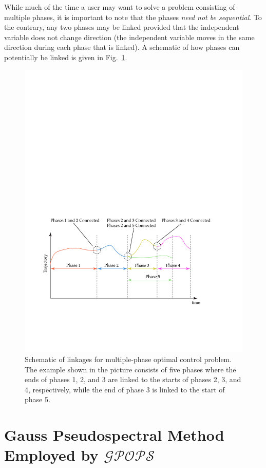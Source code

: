 \documentclass[10pt,final]{report}
\newcommand{\gpops}{$\mathcal{GPOPS}$~}
\newcounter{example}[chapter]
\begin{document}
While much of the time a user may want to solve a problem consisting of
multiple phases, it is important to note that the phases
{\em need not be sequential}.  To the contrary, any two phases may be linked
provided that the independent variable does not change direction (\ie the
independent variable moves in the same direction during each phase that is
linked).  A schematic of how phases can potentially be linked is given in
Fig.~\ref{fig: linkages}.
\begin{figure}[h]
  \centering
  \includegraphics[scale=0.95]{linkages.pdf}
  \caption{Schematic of linkages for multiple-phase optimal control problem.
    The example shown in the picture consists of five phases where the ends of
    phases 1, 2, and 3 are linked to the starts of phases 2, 3, and 4,
    respectively, while the end of phase 3 is linked to the start of phase 5.
    \label{fig: linkages}}
\end{figure}

\section{Gauss Pseudospectral Method Employed by \gpops}
\end{document}
